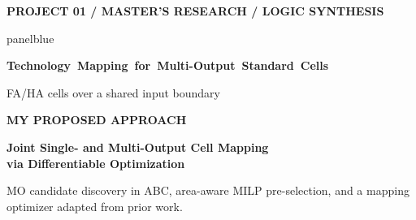 \documentclass[aspectratio=169,10pt]{beamer}
\newcommand{\smalllabel}[1]{{\scriptsize\bfseries\color{Accent}\MakeUppercase{#1}}}
\newcommand{\slidenavigation}{}
\newcommand{\slideposition}{}
\begin{document}
{
\renewcommand{\slidenavigation}{\hyperlink{details-index}{\beamerbutton{Details index}}}
\renewcommand{\slideposition}{Summary 5 / 18}
\begin{frame}[plain,label=summary-5]
  \vfill
  \smalllabel{Project 01 / Master's Research / Logic Synthesis}\par
  \vspace{.40cm}
  \begin{beamercolorbox}[rounded=true,sep=.25cm,wd=\linewidth]{panelblue}
    {\fontsize{13.6}{17}\selectfont\bfseries\color{Ink}
    \mbox{Technology Mapping for Multi-Output Standard Cells}\par}
    \vspace{.14cm}
    {\normalsize\color{Ink}
      FA/HA cells over a shared input boundary\par}
  \end{beamercolorbox}
  \vspace{.80cm}
  \smalllabel{My Proposed Approach}\par
  \vspace{.17cm}
  {\fontsize{18}{23}\selectfont\bfseries\color{Accent}
    Joint Single- and Multi-Output Cell Mapping\\
    via Differentiable Optimization\par}
  \vspace{.18cm}
  {\small\color{Muted}
    MO candidate discovery in ABC, area-aware MILP pre-selection, and a mapping optimizer adapted from prior work.\par}
  \vfill
\end{frame}}
\end{document}
